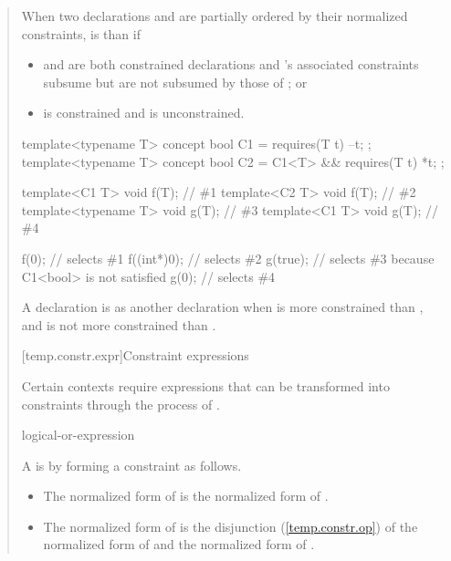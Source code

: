 \begin{quote}
\pnum
When two declarations  and  are
partially ordered by their normalized constraints,  is 
 than  if
% 
\begin{itemize}
\item {} and  are both constrained
declarations and 's associated constraints subsume but 
are not subsumed by those of ; or

\item {} is constrained and  is
unconstrained. 
\end{itemize}
% 
\enterexample
\begin{codeblock}
template<typename T> concept bool C1 = requires(T t) { --t; };
template<typename T> concept bool C2 = C1<T> && requires(T t) { *t; };

template<C1 T> void f(T);       // \#1
template<C2 T> void f(T);       // \#2
template<typename T> void g(T); // \#3
template<C1 T> void g(T);       // \#4

f(0);       // selects \#1
f((int*)0); // selects \#2
g(true);    // selects \#3 because C1<bool> is not satisfied
g(0);       // selects \#4
\end{codeblock}
\exitexample

\pnum
A declaration  is 
as another declaration  when  is more
constrained than , and  is not more
constrained than .


[temp.constr.expr]{Constraint expressions}

\pnum
Certain contexts require expressions that can be transformed
into constraints through the process of .
\begin{bnf}
\br
    logical-or-expression
\end{bnf}

\pnum
A  is  by forming a 
constraint as follows.

\begin{itemize}
\item The normalized form of  is the normalized form of 
.

\item The normalized form of  is
the disjunction (\ref{temp.constr.op}) of the 
normalized form of  and the normalized form of 
.


\end{itemize}
\end{quote}
